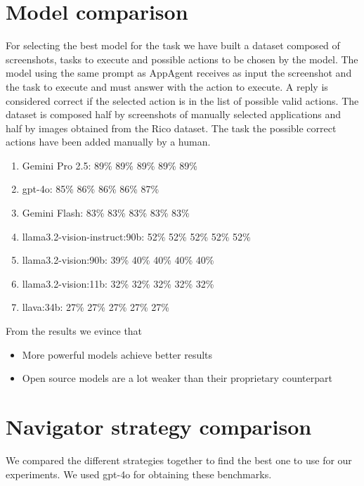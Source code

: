 \section{Model comparison}\label{model-comparison}

For selecting the best model for the task we have built a dataset
composed of screenshots, tasks to execute and possible actions to be
chosen by the model. The model using the same prompt as AppAgent
receives as input the screenshot and the task to execute and must answer
with the action to execute. A reply is considered correct if the
selected action is in the list of possible valid actions. The dataset is
composed half by screenshots of manually selected applications and half
by images obtained from the Rico dataset. The task the possible correct
actions have been added manually by a human.

\begin{enumerate}
\def\labelenumi{\arabic{enumi}.}
\tightlist
\item
  Gemini Pro 2.5: 89\% 89\% 89\% 89\% 89\%
\item
  gpt-4o: 85\% 86\% 86\% 86\% 87\%
\item
  Gemini Flash: 83\% 83\% 83\% 83\% 83\%
\item
  llama3.2-vision-instruct:90b: 52\% 52\% 52\% 52\% 52\%
\item
  llama3.2-vision:90b: 39\% 40\% 40\% 40\% 40\%
\item
  llama3.2-vision:11b: 32\% 32\% 32\% 32\% 32\%
\item
  llava:34b: 27\% 27\% 27\% 27\% 27\%
\end{enumerate}

From the results we evince that

\begin{itemize}
\tightlist
\item
  More powerful models achieve better results
\item
  Open source models are a lot weaker than their proprietary counterpart
\end{itemize}

\section{Navigator strategy
comparison}\label{navigator-strategy-comparison}

We compared the different strategies together to find the best one to
use for our experiments. We used gpt-4o for obtaining these benchmarks.

